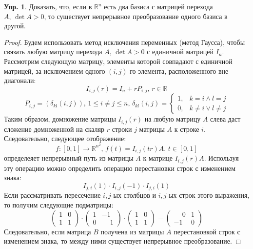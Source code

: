 \documentclass[12pt]{article}
\newcommand{\MR}{\mathbb{R}}
\theoremstyle{definition}
\newtheorem{exrc}{Упр.}
\begin{document}
\begin{exrc}
	Доказать, что, если в $\MR^n$ есть два базиса с матрицей перехода $A, \, \det{A} > 0$, то существует непрерывное преобразование одного базиса в другой.
\end{exrc}
\begin{proof}
	Будем использовать метод исключения переменных (метод Гаусса), чтобы связать любую матрицу перехода $A, \, \det{A} > 0$ с единичной матрицей $I_n$. Рассмотрим следующую матрицу, элементы которой совпадают с единичной матрицей, за исключением одного $(i,j)$-го элемента, расположенного вне диагонали:
	$$
		I_{i,j}(r) = I_n + rP_{i,j}, \, r \in \MR
	$$
	$$
		P_{i,j} = (\delta_{kl}(i,j)),\, 1 \leq i \neq j \leq n, \, \delta_{kl}(i,j) = \begin{cases}
			1, & k = i \wedge l = j\\
			0, & k \neq i \vee l \neq j
		\end{cases}
	$$
	Таким образом, домножение матрицы $I_{i,j}(r)$ на любую матрицу $A$ слева даст сложение  домноженной на скаляр $r$ строки $j$ матрицы $A$ к строке $i$. Следовательно, следующее отображение:
	$$
		f\colon [0,1] \to \MR^{n^2}, \,  f(t) = I_{i,j}(tr)A, \, t \in [0,1]
	$$
	определеяет непрерывный путь из матрицы $A$ к матрице $I_{i,j}(r)A$. Используя эту операцию можно определить операцию перестановки строк с изменением знака:
	$$
		I_{j,i}(1){\cdot}I_{i,j}(-1){\cdot}I_{j,i}(1)
	$$
	Если рассматривать пересечение $i,j$-ых столбцов и $i,j$-ых строк этого выражения, то получим следующие подматрицы:
	$$
		\begin{pmatrix}
			1 & 0 \\
			1 & 1
		\end{pmatrix}{\cdot}
		\begin{pmatrix}
			1 & -1 \\
			0 & \phantom{-}1
		\end{pmatrix}{\cdot}
		\begin{pmatrix}
			1 & 0 \\
			1 & 1
		\end{pmatrix} = 
		\begin{pmatrix}
			\phantom{-}0 & 1 \\
			-1 & 0
		\end{pmatrix}
	$$
	Следовательно, если матрица $B$ получена из матрицы $A$ перестановкой строк с изменением знака, то между ними существует непрерывное преобразование. 
	

\end{proof}
\end{document}
